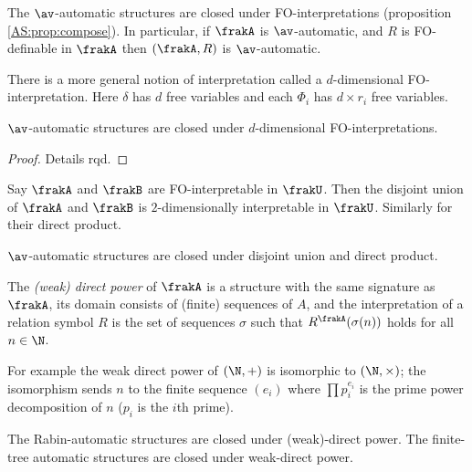 The $\av$-automatic structures are closed under FO-interpretations (proposition \ref{AS:prop:compose}).
In particular, if $\frakA$ is $\av$-automatic, and $R$ is FO-definable in $\frakA$ then $(\frakA,R)$ is $\av$-automatic.

There is a more general notion of interpretation called a $d$-dimensional FO-interpretation.
Here $\delta$ has $d$ free variables and each $\Phi_i$ has $d\times r_i$ free variables.

\begin{proposition}
$\av$-automatic structures are closed under $d$-dimensional FO-interpretations.
\end{proposition}

\begin{proof}
Details rqd.
\end{proof}

Say $\frakA$ and $\frakB$ are FO-interpretable in $\frakU$. Then the disjoint union of $\frakA$ and $\frakB$ is $2$-dimensionally interpretable in $\frakU$. Similarly for their direct product.

\begin{corollary}
$\av$-automatic structures are closed under disjoint union and direct product.
\end{corollary}

The {\em (weak) direct power} of $\frakA$ is a structure with the same signature as $\frakA$, its domain consists of (finite) sequences of $A$, and the 
interpretation of a relation symbol $R$ is the set of sequences $\sigma$ such that $R^\frakA(\sigma(n))$ holds for all $n \in \N$.

For example the weak direct power of $(\N,+)$ is isomorphic to $(\N,\times)$; the isomorphism sends $n$ to  the finite sequence $(e_i)$ where
$ \prod p_i^{e_i}$ is the prime power decomposition of $n$ ($p_i$ is the $i$th prime).
 
\begin{proposition}
The Rabin-automatic structures are closed under (weak)-direct power. The finite-tree automatic structures are closed under weak-direct power.
\end{proposition}

